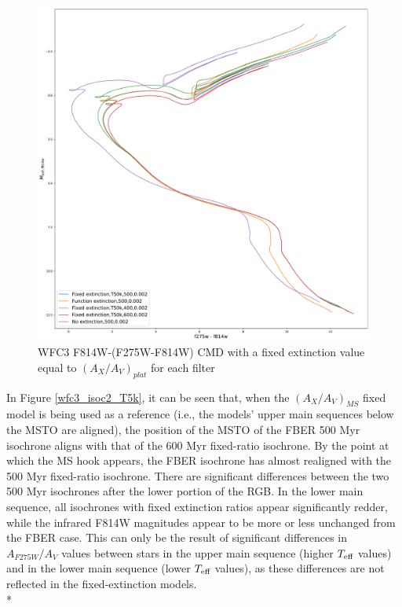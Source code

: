 \documentclass[12pt, a4paper]{report}
\begin{document}
\begin{figure}[h!]
\begin{center}
\includegraphics[width=1.0\textwidth]{../basti_isochrones_10_13Gyr/Extinction_T50k_FeH0fix_func_f814w_f275wmf814w_500_400_600_Myr_FeH_0p002_ref_noext_Av_1p0.pdf}
\caption{WFC3 F814W-(F275W-F814W) CMD with a fixed extinction value equal to $(A_{X}/A_{V})_{plat}$ for each filter}
\label{wfc3_isoc2_T50k}
\end{center}
\end{figure}

In Figure \ref{wfc3_isoc2_T5k}, it can be seen that, when the $(A_{X}/A_{V})_{MS}$ fixed model is being used as a reference (i.e., the models' upper main sequences below the MSTO are aligned), the position of the MSTO of the FBER 500 Myr isochrone aligns with that of the 600 Myr fixed-ratio isochrone. By the point at which the MS hook \citep{1998MNRAS.298..525P} appears, the FBER isochrone has almost realigned with the 500 Myr fixed-ratio isochrone. There are significant differences between the two 500 Myr isochrones after the lower portion of the RGB. In the lower main sequence, all isochrones with fixed extinction ratios appear significantly redder, while the infrared F814W magnitudes appear to be more or less unchanged from the FBER case. This can only be the result of significant differences in $A_{F275W}/A_{V}$ values between stars in the upper main sequence (higher $T_{\textnormal{eff}}$ values) and in the lower main sequence (lower $T_{\textnormal{eff}}$ values), as these differences are not reflected in the fixed-extinction models. \\*
\end{document}
